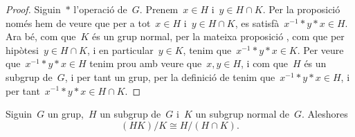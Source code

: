 \documentclass[../estructures-algebraiques.tex]{subfiles}
\begin{document}
    \begin{proof}
        Siguin~\(\ast\) l'operació de~\(G\).
        Prenem~\(x\in H\) i~\(y\in H\cap K\).
        Per la proposició  només hem de veure que per a tot~\(x\in H\) i~\(y\in H\cap K\), es satisfà~\(x^{-1}\ast y\ast x\in H\).
        Ara bé, com que~\(K\) és un grup normal, per la mateixa proposició , com que per hipòtesi~\(y\in H\cap K\), i en particular~\(y\in K\), tenim que~\(x^{-1}\ast y\ast x\in K\).
        Per veure que~\(x^{-1}\ast y\ast x\in H\) tenim prou amb veure que~\(x,y\in H\), i com que~\(H\) és un subgrup de~\(G\), i per tant un grup, per la definició de  tenim que~\(x^{-1}\ast y\ast x\in H\), i per tant~\(x^{-1}\ast y\ast x\in H\cap K\).
    \end{proof}
    \begin{theorem}
        \label{thm:Segon-Teorema-de-lisomorfisme-entre-grups}
        Siguin~\(G\) un grup,~\(H\) un subgrup de~\(G\) i~\(K\) un subgrup normal de~\(G\).
        Aleshores
        \[
            (HK)/K\cong H/(H\cap K).
        \]
    \end{theorem}
\end{document}
